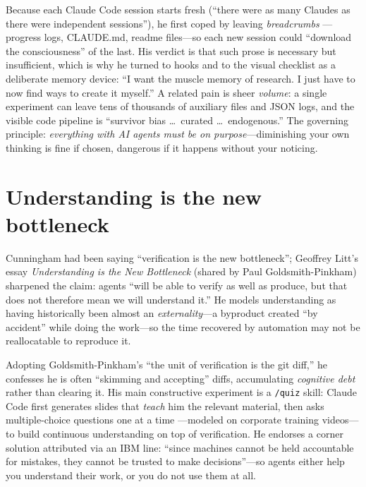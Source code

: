 \documentclass[11pt]{article}
\begin{document}
Because each Claude Code session starts fresh (``there were as many Claudes as
there were independent sessions''), he first coped by leaving \emph{breadcrumbs}
---progress logs, CLAUDE.md, readme files---so each new session could
``download the consciousness'' of the last. His verdict is that such prose is
necessary but insufficient, which is why he turned to hooks and to the visual
checklist as a deliberate memory device: ``I want the muscle memory of research.
I just have to now find ways to create it myself.'' A related pain is sheer
\emph{volume}: a single experiment can leave tens of thousands of auxiliary files
and JSON logs, and the visible code pipeline is ``survivor bias \ldots\ curated
\ldots\ endogenous.'' The governing principle: \emph{everything with AI agents
must be on purpose}---diminishing your own thinking is fine if chosen, dangerous
if it happens without your noticing.

\section{Understanding is the new bottleneck}
Cunningham had been saying ``verification is the new bottleneck''; Geoffrey
Litt's essay \emph{Understanding is the New Bottleneck} (shared by Paul
Goldsmith-Pinkham) sharpened the claim: agents ``will be able to verify as well
as produce, but that does not therefore mean we will understand it.'' He models
understanding as having historically been almost an \emph{externality}---a
byproduct created ``by accident'' while doing the work---so the time recovered by
automation may not be reallocatable to reproduce it.

Adopting Goldsmith-Pinkham's ``the unit of verification is the git diff,'' he
confesses he is often ``skimming and accepting'' diffs, accumulating
\emph{cognitive debt} rather than clearing it. His main constructive experiment
is a \texttt{/quiz} skill: Claude Code first generates slides that \emph{teach}
him the relevant material, then asks multiple-choice questions one at a time
---modeled on corporate training videos---to build continuous understanding on
top of verification. He endorses a corner solution attributed via an IBM line:
``since machines cannot be held accountable for mistakes, they cannot be trusted
to make decisions''---so agents either help you understand their work, or you do
not use them at all.
\end{document}
